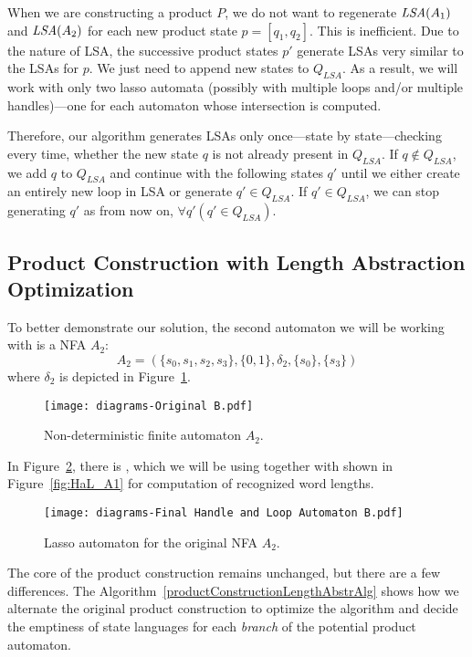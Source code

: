 When we are constructing a product $P$, we do not want to regenerate $\emph{LSA}(A_1)$ and $\emph{LSA}(A_2)$ for each new product state $p = [q_1, q_2]$. This is inefficient. Due to the nature of LSA, the successive product states $p'$ generate LSAs very similar to the LSAs for $p$. We just need to append new states to $Q_{LSA}$. As a result, we will work with only two lasso automata (possibly with multiple loops and/or multiple handles)---one for each automaton whose intersection is computed.

Therefore, our algorithm generates LSAs only once---state by state---checking every time, whether the new state $q$ is not already present in $Q_{LSA}$. If $q \notin Q_{LSA}$, we add $q$ to $Q_{LSA}$ and continue with the following states $q'$ until we either create an entirely new loop in LSA or generate $q' \in Q_{LSA}$. If $q' \in Q_{LSA}$, we can stop generating $q'$ as from now on, $\forall q' ( q' \in Q_{LSA})$.

\subsection{Product Construction with Length Abstraction Optimization}

To better demonstrate our solution, the second automaton we will be working with is a NFA $A_2$:
$$ A_2 = (\{s_0, s_1, s_2, s_3\}, \{0, 1\}, \delta_2, \{s_0\}, \{s_3\}) $$
where $\delta_2$ is depicted in Figure~\ref{fig:NFA_A2_orig}.

\begin{figure}[ht]
    \centering
	\texttt{[image: diagrams-Original B.pdf]}
	\caption{Non-deterministic finite automaton $A_2$.}
	\label{fig:NFA_A2_orig}
\end{figure}

In Figure~\ref{fig:HaL_A2}, there is , which we will be using together with  shown in Figure~\ref{fig:HaL_A1} for computation of recognized word lengths.

\begin{figure}[ht]
    \centering
	\texttt{[image: diagrams-Final Handle and Loop Automaton B.pdf]}
	\caption{Lasso automaton  for the original NFA $A_2$.}
	\label{fig:HaL_A2}
\end{figure}

The core of the product construction remains unchanged, but there are a few differences. The Algorithm~\ref{productConstructionLengthAbstrAlg} shows how we alternate the original product construction to optimize the algorithm and decide the emptiness of state languages for each \emph{branch} of the potential product automaton.


